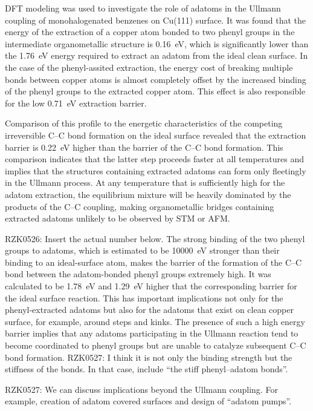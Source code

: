 \documentclass[%
 reprint,
 amsmath,amssymb,
 aps,
prb,
floatfix,
]{revtex4-2}
\newcommand{\lock}{\color{red}}
\newcommand{\lock}{\color{red}}
\newcommand{\comm}{\color{Purple}} %
\begin{document}
{\lock

DFT modeling was used to investigate the role of adatoms in the Ullmann coupling of monohalogenated benzenes on Cu(111) surface. It was found that the energy of the extraction of a copper atom bonded to two phenyl groups in the intermediate organometallic structure is \SI{0.16}{\electronvolt}, which is significantly lower than the \SI{1.76}{\electronvolt} energy required to extract an adatom from the ideal clean surface. In the case of the phenyl-assited extraction, the energy cost of breaking multiple bonds between copper atoms is almost completely offset by the increased binding of the phenyl groups to the extracted copper atom. This effect is also responsible for the low \SI{0.71}{\electronvolt} extraction barrier. 

Comparison of this profile to the energetic characteristics of the competing irreversible C--C bond formation on the ideal surface revealed that the extraction barrier is \SI{0.22}{\electronvolt} higher than the barrier of the C--C bond formation. This comparison indicates that the latter step proceeds faster at all temperatures and implies that the structures containing extracted adatoms can form only fleetingly in the Ullmann process. At any temperature that is sufficiently high for the adatom extraction, the equilibrium mixture will be heavily dominated by the products of the C--C coupling, making organometallic bridges containing extracted adatoms unlikely to be observed by STM or AFM.


{\comm RZK0526: Insert the actual number below.}
The strong binding of the two phenyl groups to adatoms, which is estimated to be \SI{10000}{\electronvolt} stronger than their binding to an ideal-surface atom, makes the barrier of the formation of the C--C bond between the adatom-bonded phenyl groups extremely high. It was calculated to be \SI{1.78}{\electronvolt} and \SI{1.29}{\electronvolt} higher that the corresponding barrier for the ideal surface reaction. This has important implications not only for the phenyl-extracted adatoms but also for the adatoms that exist on clean copper surface, for example, around steps and kinks. The presence of such a high energy barrier implies that any adatoms participating in the Ullmann reaction tend to become coordinated to phenyl groups but are unable to catalyze subsequent C--C bond formation.
{\comm RZK0527: I think it is not only the binding strength but the stiffness of the bonds. In that case, include ``the stiff phenyl--adatom bonds''.}

{\comm RZK0527: We can discuss implications beyond the Ullmann coupling. For example, creation of adatom covered surfaces and design of ``adatom pumps''.}

}
\end{document}
